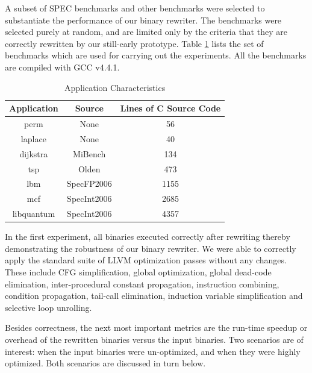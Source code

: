 A subset of SPEC benchmarks and other benchmarks were selected to substantiate the performance of
our binary rewriter. The benchmarks were selected purely at random, and are limited only by the
criteria that they are correctly rewritten by our still-early prototype. Table \ref{benchlist} lists
the set of benchmarks which are used for carrying out the experiments. All the benchmarks are
compiled with GCC v4.4.1.

\begin{table}
\begin{center}
\begin{tabular}{ | c | c | c | }
\hline
\textbf{Application} & \textbf{Source} & \textbf{Lines of C Source Code} \\
\hline
\hline
perm & None & 56 \\
\hline
laplace & None & 40 \\
\hline
dijkstra & MiBench & 134 \\
\hline
tsp & Olden & 473 \\
\hline
lbm & SpecFP2006 & 1155 \\
\hline
mcf & SpecInt2006 & 2685 \\
\hline
libquantum & SpecInt2006 & 4357 \\
\hline
\end{tabular}
\end{center}

\caption{Application Characteristics}
\label{benchlist}
\end{table}

In the first experiment, all binaries executed correctly after rewriting thereby demonstrating the
robustness of our binary rewriter. We were able to correctly apply the standard suite of LLVM
optimization passes without any changes. These include CFG simplification, global optimization,
global dead-code elimination, inter-procedural constant propagation, instruction combining,
condition propagation, tail-call elimination, induction variable simplification and selective loop
unrolling.

Besides correctness, the next most important metrics are the run-time speedup or overhead of the
rewritten binaries versus the input binaries. Two scenarios are of interest: when the input binaries
were un-optimized, and when they were highly optimized. Both scenarios are discussed in turn below.

